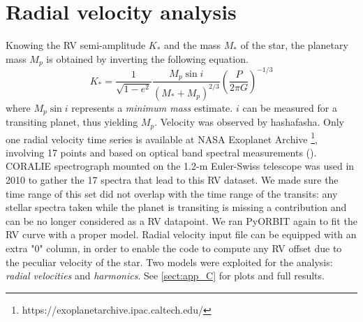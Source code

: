 \documentclass[a4paper,11pt,twocolumn]{article}
\begin{document}
\newpage

\section{Radial velocity analysis}
Knowing the RV semi-amplitude $K_*$ and the mass $M_*$ of the star,
the planetary mass $M_p$ is obtained by inverting the following equation. 
\begin{equation}
    K_* = \frac{1}{\sqrt{1-e^2}}\frac{M_p \sin{i}}{(M_*+M_p)^{2/3}}\left(\frac{P}{2\pi G}\right)^{-1/3}
\end{equation}
where $M_p\sin{i}$ represents a \textit{minimum mass} estimate. $i$ can be 
measured for a transiting planet, thus yielding $M_p$.
Velocity was observed by hashafasha. Only one radial velocity time series
is available at NASA Exoplanet Archive \footnote{https://exoplanetarchive.ipac.caltech.edu/}, 
involving 17 points and based on optical band spectral measurements 
(\cite{Anderson}). CORALIE spectrograph mounted on the 1.2-m
Euler-Swiss telescope was used in 2010 to gather the 17 spectra that lead
to this RV dataset. We made sure the time range of this set did not overlap 
with the time range of the transits: any stellar spectra taken while the planet is 
transiting is missing a contribution and can be no longer considered as a RV 
datapoint.
We ran PyORBIT again to fit the RV curve with a proper model. Radial velocity input
file can be equipped with an extra "0" column, in order to enable the code to compute
any RV offset due to the peculiar velocity of the star.
Two models were exploited for the analysis: \textit{radial velocities} and 
\textit{harmonics}. See \ref{sect:app_C} for plots and full results.
\end{document}
